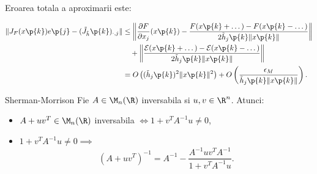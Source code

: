 \begin{demonstratie}
    Eroarea totala a aproximarii este:

    \begin{align*}
        \| J_F(x\p{k})e\p{j} - (\tilde{J}_{\tilde{h}}\p{k})_{\cdot, j} \| &\leq \left\| \frac{\partial F}{\partial x_j}(x\p{k}) - \frac{F(x\p{k} + \dots) - F(x\p{k} - \dots)}{2\tilde{h}_j\p{k} \|x\p{k}\|} \right\| \\
        &\quad + \left\| \frac{\mathcal{E}(x\p{k} + \dots) - \mathcal{E}(x\p{k} - \dots)}{2\tilde{h}_j\p{k} \|x\p{k}\|} \right\| \\
        &= O\left( (\tilde{h}_j\p{k})^2 \|x\p{k}\|^2 \right) + O\left( \frac{\epsilon_M}{\tilde{h}_j\p{k} \|x\p{k}\|} \right).
    \end{align*} 

\end{demonstratie}

\begin{lema}{Sherman-Morrison}
    Fie $A \in \M_n(\R)$ inversabila si $u, v \in \R^n$. Atunci:

\begin{itemize}
    \item[(i)] $A + u v^T \in \M_n(\R)$ inversabila $\iff 1 + v^T A^{-1} u \neq 0$,
    \item[(ii)] $1 + v^T A^{-1} u \neq 0 \implies$
    $$ (A + u v^T)^{-1} = A^{-1} - \frac{A^{-1} u v^T A^{-1}}{1 + v^T A^{-1} u}. $$
\end{itemize}
\end{lema}

